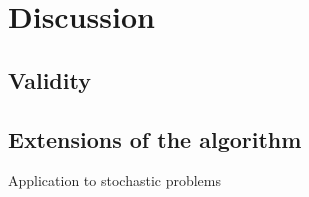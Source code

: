 \documentclass[10pt,letterpaper]{article}
\theoremstyle{definition}
\theoremstyle{remark}
\begin{document}
\section*{Discussion}
\subsection*{Validity}\label{sec. validityAlgo}
%
%
%
%

\subsection*{Extensions of the algorithm}\label{sec. extensions}

Application to stochastic problems
\end{document}
